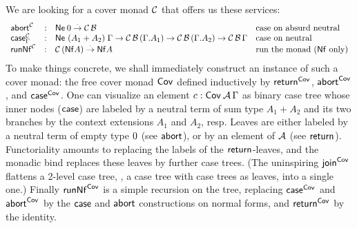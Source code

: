 \documentclass[a4paper,USenglish,cleveref, autoref]{lipics-v2019}
\begin{document}
We are looking for a cover monad $\C$ that
offers us these services:
\[
\begin{array}{lcl@{\quad}l}
\tabort^\C & : & \tNe\, \tyzero \todot \C\,\B
  & \mbox{case on absurd neutral} \\
\tcase^\C_\Gamma & : & \Ne {(A_1 + A_2)} \Gamma
  \to \C\,\B\,(\cext \Gamma {A_1})
  \to \C\,\B\,(\cext \Gamma {A_2})
  \to \C\,\B\,\Gamma
  & \mbox{case on neutral} \\
\trunNf[\C] & : & \C\,(\tNf A) \todot \tNf A
  & \mbox{run the monad ($\tNf$ only)} \\
\end{array}
\]
To make things concrete,
we shall immediately construct an instance of such a cover monad:
the free cover monad
$\Cov$ defined inductively by $\treturn[\Cov]$, $\tabort^{\Cov}$, and
$\tcase^{\Cov}$.  One can visualize an element $c : \Cov\,\A\,\Gamma$ as
binary case tree whose inner nodes ($\tcase$) are labeled by a neutral term
of sum type $A_1+A_2$ and its two branches by the context extensions $A_1$
and $A_2$, resp.  Leaves are either
labeled by a neutral term of empty type $\tyzero$ (see $\tabort$),
or by an element of $\A$ (see $\treturn$).  Functoriality amounts to
replacing the labels of the $\treturn$-leaves, and the monadic bind replaces
these leaves by further case trees.  (The uninspiring $\tjoin[\Cov]$
flattens a 2-level case tree, \ie, a case tree with case trees as
leaves, into a single one.)
Finally $\trunNf[\Cov]$ is a simple recursion on the tree, replacing $\tcase^{\Cov}$
and $\tabort^{\Cov}$
by the $\tcase$ and $\tabort$ constructions on normal forms, and
$\treturn[\Cov]$ by the identity.

\end{document}
